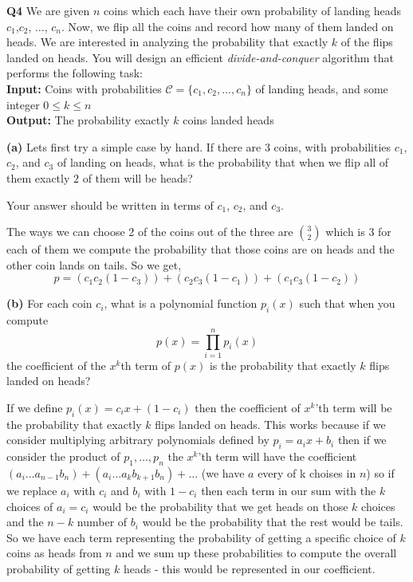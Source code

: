 \documentclass[12pt]{article}
\newcommand{\question}[3][Q]{
\begin{description}
\item \textbf{#1{#2}} #3
\end{description}
}
\newcommand{\note}[1]{{\footnotesize
    \begin{description}
    [leftmargin=3.4em,style=nextline]
        \item[Note:] {#1}
    \end{description}}   
}
\begin{document}
\newpage
\question{4}{
    We are given $n$ coins which each have their own probability of landing heads $c_1$,$c_2$, $\dots$, $c_n$. Now, we flip all the coins and record how many of them landed on heads. We are interested in analyzing the probability that exactly $k$ of the flips landed on heads. 
    You will design an efficient \textit{divide-and-conquer} algorithm that performs the following task:\\
    
    \textbf{Input:} Coins with probabilities $\mathcal{C} = \{c_1, c_2, \dots, c_n\}$ of landing heads, and some integer $0 \le k \le n$\\
    \textbf{Output:} The probability exactly $k$ coins landed heads
}

\question[]{(a)}{
    Lets first try a simple case by hand. If there are 3 coins, with probabilities $c_1$, $c_2$, and $c_3$ of landing on heads, what is the probability that when we flip all of them exactly $2$ of them will be heads?
    \note{Your answer should be written in terms of $c_1$, $c_2$, and $c_3$.}
}
\begin{answer}
    The ways we can choose 2 of the coins out of the three are $3 \choose 2$ which is $3$ for each of them we compute the probability that those coins are on heads and the other coin lands on tails. So we get,  
    $$ p = (c_1   c_2   (1 - c_3)) + (c_2  c_3  (1 - c_1)) + (c_1   c_3  (1 - c_2)) $$ 
\end{answer}

\question[]{(b)}{
    For each coin $c_i$, what is a polynomial function $p_i(x)$ such that when you compute $$p(x) = \prod_{i=1}^n p_i(x)$$
    the coefficient of the $x^k$th term of $p(x)$ is the probability that exactly $k$ flips landed on heads?
}
\begin{answer}
    If we define $p_i(x) = c_i x + (1 - c_i)$ then the coefficient of $x^{k}$'th  term will be the probability that exactly $k$ flips landed on heads. This works because if we consider multiplying arbitrary polynomials defined by $p_i = a_ix + b_i $ then if we consider the product of $p_1,\dots,p_n$ the $x^{k}$'th term will have the coefficient $(a_i \dots a_{n - 1} b_n) +(a_i \dots a_{k} b_{k + 1} b_{n}) + \dots$ (we have $a$ every of k choises  in $n$) so if we replace  $a_i$ with  $c_i$ and  $b_i$ with $1 - c_i$ then each term in our sum with the $k$ choices of $a_i = c_i$ would be the probability that we get heads on those  $k$ choices and the  $n - k$ number of $b_i$ would be the probability that the rest would be tails. So we have each term representing the probability of getting a specific choice of $k$ coins as heads from  $n$ and we sum up these probabilities to compute the overall probability of getting  $k$ heads - this would be represented in our coefficient.
\end{answer}
\end{document}
